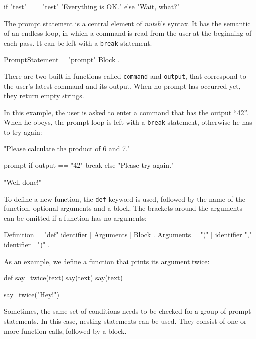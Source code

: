 \documentclass[paper=a4,twoside,abstract=on,cleardoublepage=empty,numbers=noenddot,toc=bib,12pt,appendixprefix=true]{scrreprt}
\begin{document}
\begin{nutsh}
if "test" == "test" {
    "Everything is OK."
} else {
    "Wait, what?"
}
\end{nutsh}


The prompt statement is a central element of \emph{nutsh}'s syntax. It has the semantic of an endless loop, in which a command is read from the user at the beginning of each pass. It can be left with a \texttt{break} statement.

\begin{ebnf}
PromptStatement = "prompt" Block .
\end{ebnf}
%
There are two built-in functions called \texttt{command} and \texttt{output}, that correspond to the user's latest command and its output. When no prompt has occurred yet, they return empty strings.

In this example, the user is asked to enter a command that has the output “42”. When he obeys, the prompt loop is left with a \texttt{break} statement, otherwise he has to try again:

\begin{nutsh}
"Please calculate the product of 6 and 7."

prompt {
    if output == "42" {
        break
    } else {
        "Please try again."
    }
}

"Well done!"
\end{nutsh}


To define a new function, the \texttt{def} keyword is used, followed by the name of the function, optional arguments and a block. The brackets around the arguments can be omitted if a function has no arguments:

\begin{ebnf}
Definition = "def" identifier [ Arguments ] Block .
Arguments = "(" [ identifier { "," identifier } ] ")" .
\end{ebnf}
%
As an example, we define a function that prints its argument twice:

\begin{nutsh}
def say_twice(text) {
    say(text)
    say(text)
}

say_twice("Hey!")
\end{nutsh}


Sometimes, the same set of conditions needs to be checked for a group of prompt statements. In this case, nesting statements can be used. They consist of one or more function calls, followed by a block.
\end{document}
